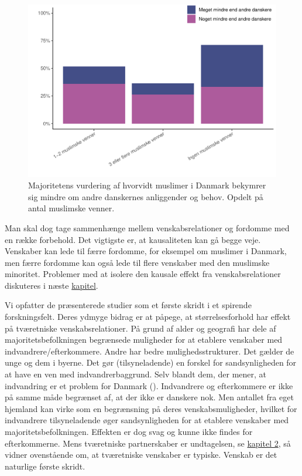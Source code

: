 \documentclass[
]{book}
\begin{document}
\begin{figure}
\includegraphics[width=1\linewidth]{en-befolkning-blander-sig_files/figure-latex/fig-6-5-1} \caption{Majoritetens vurdering af hvorvidt muslimer i Danmark bekymrer sig mindre om andre danskernes anliggender og behov. Opdelt på antal muslimske venner.}\label{fig:fig-6-5}
\end{figure}

Man skal dog tage sammenhænge mellem venskabsrelationer og fordomme med en række forbehold. Det vigtigste er, at kausaliteten kan gå begge veje. Venskaber kan lede til færre fordomme, for eksempel om muslimer i Danmark, men færre fordomme kan også lede til flere venskaber med den muslimske minoritet. Problemer med at isolere den kausale effekt fra venskabsrelationer diskuteres i næste \hyperref[kap7]{kapitel}.

Vi opfatter de præsenterede studier som et første skridt i et spirende forskningsfelt. Deres ydmyge bidrag er at påpege, at størrelsesforhold har effekt på tværetniske venskabsrelationer. På grund af alder og geografi har dele af majoritetsbefolkningen begrænsede muligheder for at etablere venskaber med indvandrere/efterkommere. Andre har bedre mulighedsstrukturer. Det gælder de unge og dem i byerne. Det gør (tilsyneladende) en forskel for sandsynligheden for at have en ven med indvandrerbaggrund. Selv blandt dem, der mener, at indvandring er et problem for Danmark (). Indvandrere og efterkommere er ikke på samme måde begrænset af, at der ikke er danskere nok. Men antallet fra eget hjemland kan virke som en begrænsning på deres venskabsmuligheder, hvilket for indvandrere tilsyneladende øger sandsynligheden for at etablere venskaber med majoritetsbefolkningen. Effekten er dog svag og kunne ikke findes for efterkommerne. Mens tværetniske partnerskaber er undtagelsen, se \hyperref[kap2]{kapitel 2}, så vidner ovenstående om, at tværetniske venskaber er typiske. Venskab er det naturlige første skridt.
\end{document}
